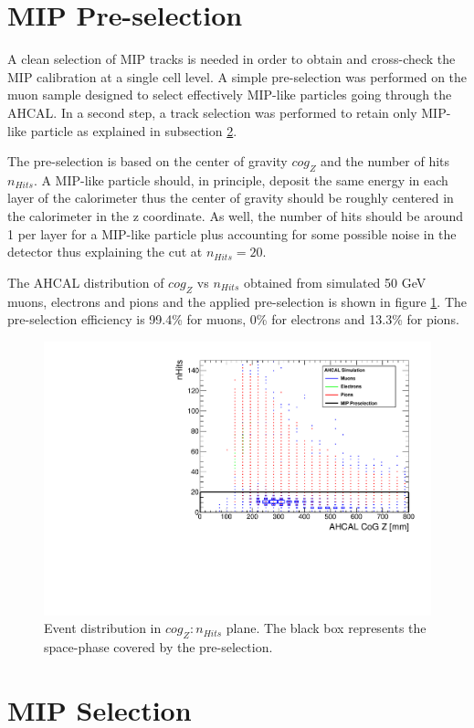 \section{MIP Pre-selection}
\label{subsec:Muon_presel}

A clean selection of MIP tracks is needed in order to obtain and cross-check the MIP calibration at a single cell level. A simple pre-selection was performed on the muon sample designed to select effectively MIP-like particles going through the AHCAL. In a second step, a track selection was performed to retain only MIP-like particle as explained in subsection \ref{subsec:Muon_sel}.

The pre-selection is based on the center of gravity $cog_Z$ and the number of hits $n_{Hits}$. A MIP-like particle should, in principle, deposit the same energy in each layer of the calorimeter thus the center of gravity should be roughly centered in the calorimeter in the z coordinate. As well, the number of hits should be around 1 per layer for a MIP-like particle plus accounting for some possible noise in the detector thus explaining the cut at $n_{Hits} = 20$.

The AHCAL distribution of $cog_Z$ vs $n_{Hits}$ obtained from simulated 50 GeV muons, electrons and pions and the applied pre-selection is shown in figure \ref{fig:Muons_CoGZ_nHits}. The pre-selection efficiency is 99.4\% for muons, 0\% for electrons and 13.3\% for pions.

\begin{figure}[htbp!]
	\centering
	\includegraphics[width=0.7\linewidth]{../Thesis_Plots/Timing/Muons/Plots/SelectionCut_nHitsCoGZ_Muons}
	\caption{Event distribution in $cog_Z:n_{Hits}$ plane. The black box represents the space-phase covered by the pre-selection.} \label{fig:Muons_CoGZ_nHits}
\end{figure}

\section{MIP Selection}
\label{subsec:Muon_sel}

